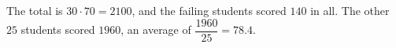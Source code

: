 The total is $30\cdot70=2100$, and the failing students scored $140$ in all. The other $25$ students scored $1960$, an average of $\dfrac{1960}{25}=\boxed{78.4}$.
